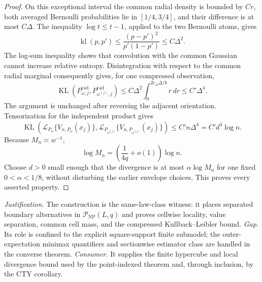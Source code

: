 \documentclass{article}
\begin{document}
\begin{proof}
On this exceptional interval the common radial density is bounded by \(Cr\), both averaged Bernoulli probabilities lie in \([1/4,3/4]\), and their difference is at most \(C\Delta\).  The inequality \(\log t\leq t-1\), applied to the two Bernoulli atoms, gives
\[
 \operatorname{kl}(p,p')
 \leq\frac{(p-p')^2}{p'(1-p')}
 \leq C\Delta^2.
\]
The log-sum inequality shows that convolution with the common Gaussian cannot increase relative entropy.  Disintegration with respect to the common radial marginal consequently gives, for one compressed observation,
\[
 \operatorname{KL}(P^{\mathrm{rad}}_{\omega,j},P^{\mathrm{rad}}_{\omega^{(j)},j})
 \leq C\Delta^2\int_0^{2c_A\Delta/b}r\,dr
 \leq C'\Delta^4.
\]
The argument is unchanged after reversing the adjacent orientation.  Tensorization for the independent product gives
\[
 \operatorname{KL}\!\left(
 \mathcal L_{P_\omega}\{V_{n,P_\omega}(x_j)\},
 \mathcal L_{P_{\omega^{(j)}}}\{V_{n,P_{\omega^{(j)}}}(x_j)\}
 \right)
 \leq C'n\Delta^4=C'd^4\log n.
\]
Because \(M_n\asymp w^{-1}\),
\[
 \log M_n=\left(\frac{1}{4q}+o(1)\right)\log n.
\]
Choose \(d>0\) small enough that the divergence is at most \(\alpha\log M_n\) for one fixed \(0<\alpha<1/8\), without disturbing the earlier envelope choices.  This proves every asserted property.
\end{proof}
\par\smallskip\noindent \textit{Justification.} The construction is the same-law-class witness: it places separated boundary alternatives in \(\mathcal P_{\mathrm{NP}}(L,q)\) and proves cellwise locality, value separation, common cell mass, and the compressed Kullback--Leibler bound. \textit{Gap.} Its role is confined to the explicit square-support finite submodel; the outer-expectation minimax quantifiers and sectionwise estimator class are handled in the converse theorem. \textit{Consumer.} It supplies the finite hypercube and local divergence bound used by the point-indexed theorem and, through inclusion, by the CTY corollary.
\end{document}
